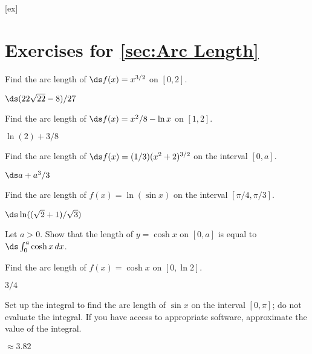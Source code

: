[ex]
\section*{Exercises for \ref{sec:Arc Length}}

\begin{enumialphparenastyle}

\begin{ex}
 Find the arc length of $\ds f(x)=x^{3/2}$ on $[0,2]$.
\begin{sol}
 $\ds (22\sqrt{22}-8)/27$
\end{sol}
\end{ex}

\begin{ex}
 Find the arc length of $\ds f(x) = x^2/8-\ln x$
on $[1,2]$.
\begin{sol}
 $\ln(2)+3/8$
\end{sol}
\end{ex}

\begin{ex}

Find the arc length of $\ds f(x) = (1/3)(x^2 +2)^{3/2}$
on the interval $[0,a]$.
\begin{sol}
 $\ds a+a^3/3$
\end{sol}
\end{ex}

\begin{ex}
 Find the arc length of $f(x)=\ln(\sin x)$ on the
interval $[\pi/4,\pi/3]$.
\begin{sol}
 $\ds \ln((\sqrt2+1)/\sqrt3)$
\end{sol}
\end{ex}

\begin{ex}
 Let $a>0$. Show that the length of $y=\cosh x$ on
$[0,a]$ is equal to $\ds \int _0 ^a \cosh x\,dx$.
\end{ex}

\begin{ex}
 Find the arc length of $f(x)=\cosh x$ on $[0, \ln 2]$.
\begin{sol}
 $3/4$
\end{sol}
\end{ex}

\begin{ex}
 Set up the integral to find the arc length of $\sin x$ 
on the interval $[0,\pi]$; do not evaluate the integral. If you have
access to appropriate software, approximate the value of the integral.
\begin{sol}
 $\approx 3.82$
\end{sol}
\end{ex}


\end{enumialphparenastyle}
